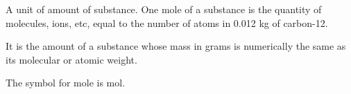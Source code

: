 A unit of amount of substance. One mole of a substance 
is the quantity of molecules, ions, etc, equal to the number
of atoms in 0.012 kg of carbon-12.
\par
It is the amount of a substance whose mass in grams is
numerically the same as its molecular or atomic weight.
\par
The symbol for mole is mol.
